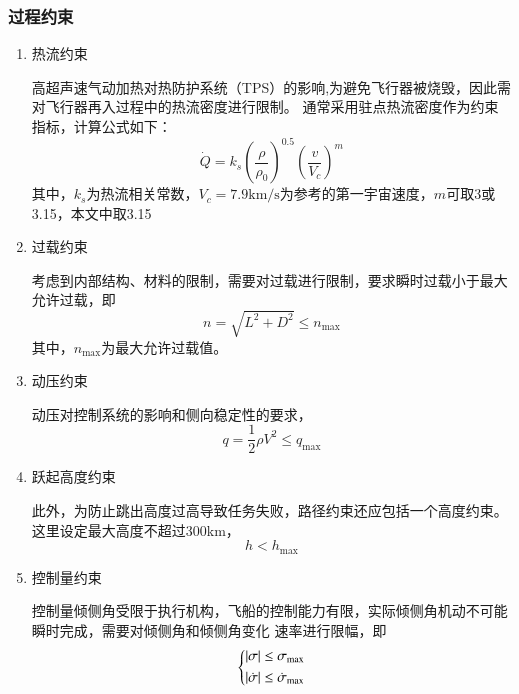 \subsubsection{过程约束}
\begin{enumerate}
	\item 热流约束\par
	      高超声速气动加热对热防护系统（TPS）的影响,为避免飞行器被烧毁，因此需对飞行器再入过程中的热流密度进行限制。
	      通常采用驻点热流密度作为约束指标，计算公式如下：
	      \begin{equation}
		      \dot{Q} = k_s\left(\frac{\rho}{\rho_{0}}\right)^{0.5}\left(\frac{v}{V_{c}}\right)^{m}
	      \end{equation}
	      其中，$ k_s $为热流相关常数，$ V_c=7.9\mathrm{km/s} $为参考的第一宇宙速度，$ m $可取3或3.15，本文中取3.15
	\item 过载约束\par
	      考虑到内部结构、材料的限制，需要对过载进行限制，要求瞬时过载小于最大允许过载，即
	      \begin{equation}
		      n=\sqrt{{{L}^{2}}+{{D}^{2}}}\le {{n}_{\max }}
	      \end{equation}
	      其中，$ n_{\max} $为最大允许过载值。
	\item 动压约束\par
	      动压对控制系统的影响和侧向稳定性的要求，
	      \begin{equation}
		      q=\frac{1}{2} \rho V^{2} \leq q_{\max }
	      \end{equation}
	\item 跃起高度约束\par
	      此外，为防止跳出高度过高导致任务失败，路径约束还应包括一个高度约束。这里设定最大高度不超过300km，
	      \begin{equation}
		      h<h_{\max}
	      \end{equation}
	\item 控制量约束\par
	      控制量倾侧角受限于执行机构，飞船的控制能力有限，实际倾侧角机动不可能瞬时完成，需要对倾侧角和倾侧角变化
	      速率进行限幅，即
	      \begin{equation}
		      \left\{
		      \begin{aligned}
			      \vert \sigma\vert       & \leq \sigma_{\max}       \\
			      \vert \dot{\sigma}\vert & \leq \dot{\sigma}_{\max} \\
		      \end{aligned} \right.
	      \end{equation}
\end{enumerate}

